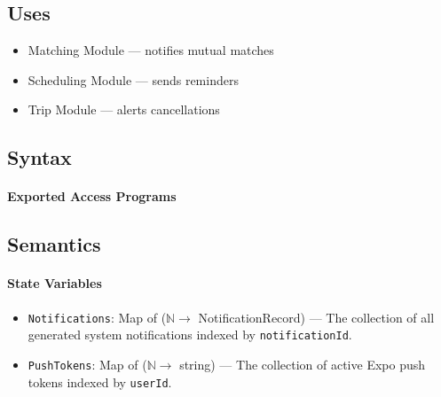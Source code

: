 \subsection{Uses}
\begin{itemize}
    \item Matching Module --- notifies mutual matches
    \item Scheduling Module --- sends reminders
    \item Trip Module --- alerts cancellations
\end{itemize}

\subsection{Syntax}

\paragraph{Exported Access Programs}
\par\vspace{0.5em}

\begin{center}
\end{center}

\subsection{Semantics}

\paragraph{State Variables}
\begin{itemize}
    \item \texttt{Notifications}: Map of ($\mathbb{N} \rightarrow$ NotificationRecord) --- The collection of all generated system notifications indexed by \texttt{notificationId}.
    \item \texttt{PushTokens}: Map of ($\mathbb{N} \rightarrow$ string) --- The collection of active Expo push tokens indexed by \texttt{userId}.
\end{itemize}

